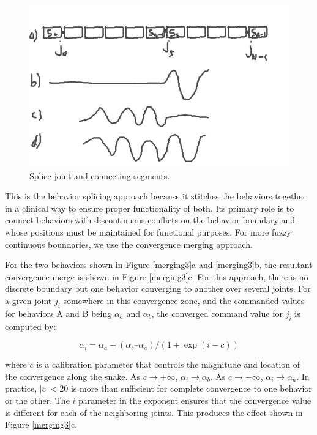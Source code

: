 \begin{figure}
\begin{center}
\includegraphics[scale=0.5]{2_behaviors_2.png}
\end{center}
\caption{Splice joint and connecting segments.}
\label{merging2}
\end{figure}

This is the behavior splicing approach because it stitches the behaviors together in a clinical way to ensure proper functionality of both.  Its primary role is to connect behaviors with discontinuous conflicts on the behavior boundary and whose positions must be maintained for functional purposes.  For more fuzzy continuous boundaries, we use the convergence merging approach.

For the two behaviors shown in Figure \ref{merging3}a and \ref{merging3}b, the resultant convergence merge is shown in Figure \ref{merging3}c.  For this approach, there is no discrete boundary but one behavior converging to another over several joints.  For a given joint $j_i$ somewhere in this convergence zone, and the commanded values for behaviors A and B being $\alpha_a$ and $\alpha_b$, the converged command value for $j_i$ is computed by:

\begin{equation}
\label{equ:slide}
\alpha_i = \alpha_a + (\alpha_b – \alpha_a) / ( 1 + \exp(i-c))
\end{equation}

where $c$ is a calibration parameter that controls the magnitude and location of the convergence along the snake.  As $c \to +\infty$, $\alpha_i \to \alpha_b$.  As $c \to -\infty$, $\alpha_i \to \alpha_a$.  In practice, $|c| < 20$ is more than sufficient for complete convergence to one behavior or the other.  The $i$ parameter in the exponent ensures that the convergence value is different for each of the neighboring joints.  This produces the effect shown in Figure \ref{merging3}c.

